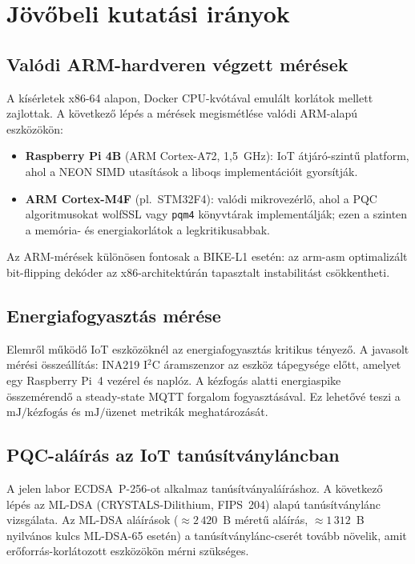 \section{Jövőbeli kutatási irányok}

\subsection{Valódi ARM-hardveren végzett mérések}

A kísérletek x86-64 alapon, Docker CPU-kvótával emulált korlátok mellett zajlottak. A
következő lépés a mérések megismétlése valódi ARM-alapú eszközökön:
\begin{itemize}
    \item \textbf{Raspberry Pi 4B} (ARM Cortex-A72, 1,5~GHz): IoT átjáró-szintű platform,
          ahol a NEON SIMD utasítások a liboqs implementációit gyorsítják.
    \item \textbf{ARM Cortex-M4F} (pl.\ STM32F4): valódi mikrovezérlő, ahol a PQC
          algoritmusokat wolfSSL vagy \texttt{pqm4} könyvtárak implementálják; ezen a
          szinten a memória- és energiakorlátok a legkritikusabbak.
\end{itemize}
Az ARM-mérések különösen fontosak a BIKE-L1 esetén: az arm-asm optimalizált bit-flipping
dekóder az x86-architektúrán tapasztalt instabilitást csökkentheti.

\subsection{Energiafogyasztás mérése}

Elemről működő IoT eszközöknél az energiafogyasztás kritikus tényező. A javasolt
mérési összeállítás: INA219 I$^2$C áramszenzor az eszköz tápegysége előtt, amelyet
egy Raspberry Pi~4 vezérel és naplóz. A kézfogás alatti energiaspike összemérendő a
steady-state MQTT forgalom fogyasztásával. Ez lehetővé teszi a $\text{mJ/kézfogás}$
és $\text{mJ/üzenet}$ metrikák meghatározását.

\subsection{PQC-aláírás az IoT tanúsítványláncban}

A jelen labor ECDSA~P-256-ot alkalmaz tanúsítványaláíráshoz. A következő lépés az
ML-DSA (CRYSTALS-Dilithium, FIPS~204) alapú tanúsítványlánc vizsgálata. Az ML-DSA
aláírások ($\approx 2\,420$~B méretű aláírás, $\approx 1\,312$~B nyilvános kulcs
ML-DSA-65 esetén) a tanúsítványlánc-cserét tovább növelik, amit erőforrás-korlátozott
eszközökön mérni szükséges.

